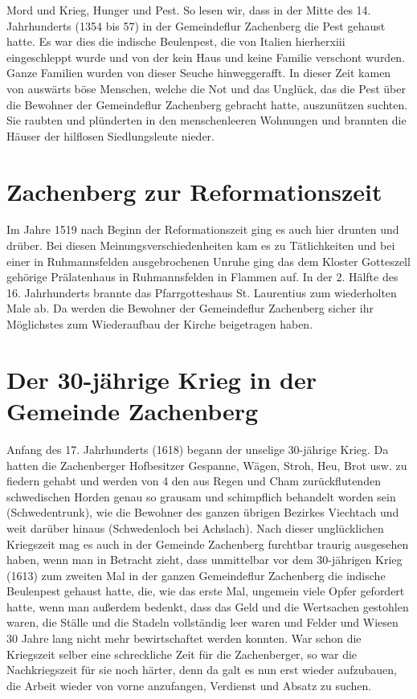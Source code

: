 \documentclass[12pt,a4pager]{book}
\begin{document}
Mord und Krieg, Hunger und Pest. So lesen wir, dass in der Mitte des 14.
Jahrhunderts (1354 bis 57) in der Gemeindeflur Zachenberg die Pest gehaust
hatte. Es war dies die indische Beulenpest, die von Italien hierherxiii
eingeschleppt wurde und von der kein Haus und keine Familie verschont wurden.
Ganze Familien wurden von dieser Seuche hinweggerafft. In dieser Zeit kamen von
auswärts böse Menschen, welche die Not und das Unglück, das die Pest über die
Bewohner der Gemeindeflur Zachenberg gebracht hatte, auszunützen suchten. Sie
raubten und plünderten in den menschenleeren Wohnungen und brannten die Häuser
der hilflosen Siedlungsleute nieder.

\section{Zachenberg zur Reformationszeit}

Im Jahre 1519 nach Beginn der Reformationszeit ging es auch hier drunten und
drüber. Bei diesen Meinungsverschiedenheiten kam es zu Tätlichkeiten und bei
einer in Ruhmannsfelden ausgebrochenen Unruhe ging das dem Kloster Gotteszell
gehörige Prälatenhaus in Ruhmannsfelden in Flammen auf. In der 2. Hälfte des 16.
Jahrhunderts brannte das Pfarrgotteshaus St. Laurentius zum wiederholten Male
ab. Da werden die Bewohner der Gemeindeflur Zachenberg sicher ihr Möglichstes
zum Wiederaufbau der Kirche beigetragen haben.

\section{Der 30-jährige Krieg in der Gemeinde Zachenberg}

Anfang des 17. Jahrhunderts (1618) begann der unselige 30-jährige Krieg. Da
hatten die Zachenberger Hofbesitzer Gespanne, Wägen, Stroh, Heu, Brot usw. zu
fiedern gehabt und werden von 4 den aus Regen und Cham zurückflutenden
schwedischen Horden genau so grausam und schimpflich behandelt worden sein
(Schwedentrunk), wie die Bewohner des ganzen übrigen Bezirkes Viechtach und weit
darüber hinaus (Schwedenloch bei Achslach). Nach dieser unglücklichen Kriegszeit
mag es auch in der Gemeinde Zachenberg furchtbar traurig ausgesehen haben, wenn
man in Betracht zieht, dass unmittelbar vor dem 30-jährigen Krieg (1613) zum
zweiten Mal in der ganzen Gemeindeflur Zachenberg die indische Beulenpest
gehaust hatte, die, wie das erste Mal, ungemein viele Opfer gefordert hatte,
wenn man außerdem bedenkt, dass das Geld und die Wertsachen gestohlen waren, die
Ställe und die Stadeln vollständig leer waren und Felder und Wiesen 30 Jahre
lang nicht mehr bewirtschaftet werden konnten. War schon die Kriegszeit selber
eine schreckliche Zeit für die Zachenberger, so war die Nachkriegszeit für sie
noch härter, denn da galt es nun erst wieder aufzubauen, die Arbeit wieder von
vorne anzufangen, Verdienst und Absatz zu suchen.
\end{document}
